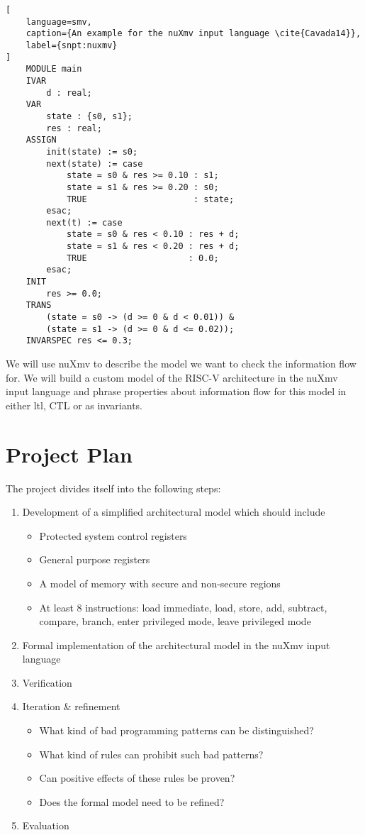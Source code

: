 \documentclass{securem}
\begin{document}
\begin{lstlisting}[
    language=smv,
    caption={An example for the nuXmv input language \cite{Cavada14}},
    label={snpt:nuxmv}
]
    MODULE main
    IVAR
        d : real;
    VAR
        state : {s0, s1};
        res : real;
    ASSIGN
        init(state) := s0;
        next(state) := case
            state = s0 & res >= 0.10 : s1;
            state = s1 & res >= 0.20 : s0;
            TRUE                     : state;
        esac;
        next(t) := case
            state = s0 & res < 0.10 : res + d;
            state = s1 & res < 0.20 : res + d;
            TRUE                    : 0.0;
        esac;
    INIT
        res >= 0.0;
    TRANS
        (state = s0 -> (d >= 0 & d < 0.01)) &
        (state = s1 -> (d >= 0 & d <= 0.02));
    INVARSPEC res <= 0.3;
\end{lstlisting}

We will use nuXmv to describe the model we want to check the information flow for.
We will build a custom model of the RISC-V architecture in the nuXmv input language and phrase properties about information flow for this model in either \gls{ltl}, CTL or as invariants.

\section{Project Plan}

The project divides itself into the following steps:
\begin{enumerate}
    \item Development of a simplified architectural model which should include
    \begin{itemize}
        \item Protected system control registers
        \item General purpose registers
        \item A model of memory with secure and non-secure regions
        \item At least 8 instructions: load immediate, load, store, add, subtract, compare, branch, enter privileged mode, leave privileged mode
    \end{itemize}
    \item Formal implementation of the architectural model in the nuXmv input language
    \item Verification
    \item Iteration \& refinement
    \begin{itemize}
        \item What kind of bad programming patterns can be distinguished?
        \item What kind of rules can prohibit such bad patterns?
        \item Can positive effects of these rules be proven?
        \item Does the formal model need to be refined?
    \end{itemize}
    \item Evaluation
\end{enumerate}



\end{document}
